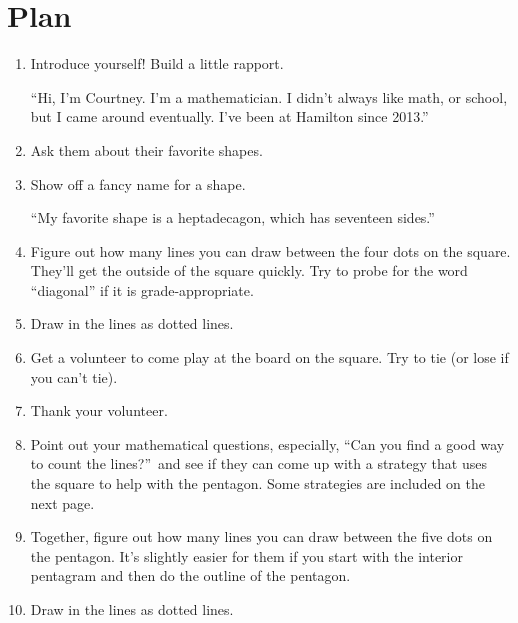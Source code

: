 \documentclass{article}
\begin{document}
    \section{Plan}
        \begin{enumerate}
            \item Introduce yourself! Build a little rapport.
            
            ``Hi, I'm Courtney. I'm a mathematician. I didn't always like math, or school, but I came around eventually. I've been at Hamilton since 2013.'' 
            
            \item Ask them about their favorite shapes.
            
            \item Show off a fancy name for a shape.
            
            ``My favorite shape is a heptadecagon, which has seventeen sides.''
            
            \item Figure out how many lines you can draw between the four dots on the square. They'll get the outside of the square quickly. Try to probe for the word ``diagonal'' if it is grade-appropriate.
            
            \item Draw in the lines as dotted lines.
            
            \item Get a volunteer to come play at the board on the square. Try to tie (or lose if you can't tie).
            
            \item Thank your volunteer.
            
            \item Point out your mathematical questions, especially, ``Can you find a good way to count the lines?''\ and see if they can come up with a strategy that uses the square to help with the pentagon. Some strategies are included on the next page.
            
            \item Together, figure out how many lines you can draw between the five dots on the pentagon. It's slightly easier for them if you start with the interior pentagram and then do the outline of the pentagon.
            
            \item Draw in the lines as dotted lines.
            

\end{enumerate}
\end{document}
